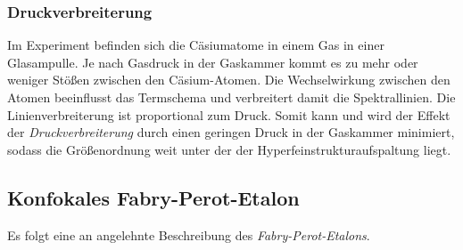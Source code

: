\documentclass[../bericht.tex]{subfiles}
\begin{document}
      \subsubsection{Druckverbreiterung}
      \label{sssec:druckverbreiterung}

        Im Experiment befinden sich die C\"asiumatome in einem Gas in einer Glasampulle. Je nach Gasdruck in der Gaskammer kommt es zu mehr oder weniger St\"o\ss{}en zwischen den C\"asium-Atomen. Die Wechselwirkung zwischen den Atomen beeinflusst das Termschema und
        verbreitert damit die Spektrallinien. Die Linienverbreiterung ist proportional zum Druck. Somit kann und wird der Effekt der \textit{Druckverbreiterung} durch einen geringen Druck in der Gaskammer minimiert, sodass die Gr\"o\ss{}enordnung weit unter der der Hyperfeinstrukturaufspaltung liegt.


      \subsection{Konfokales Fabry-Perot-Etalon}
      \label{subsec:fabry-perot-etalon}

        Es folgt eine an \cite{dem:laser} angelehnte Beschreibung des \textit{Fabry-Perot-Etalons}.
\end{document}
